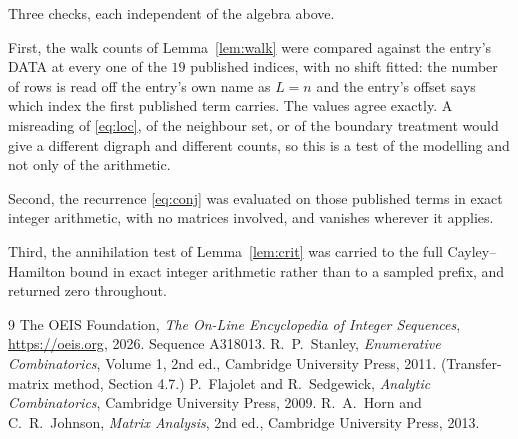 \documentclass[11pt,a4paper]{article}
\theoremstyle{plain}
\theoremstyle{definition}
\begin{document}
Three checks, each independent of the algebra above.

First, the walk counts of Lemma~\ref{lem:walk} were compared against the entry's DATA at
every one of the $19$ published indices, with no shift fitted: the number of rows is
read off the entry's own name as $L=n$ and the entry's offset says which index the first
published term carries. The values agree exactly. A misreading of \eqref{eq:loc}, of the
neighbour set, or of the boundary treatment would give a different digraph and different
counts, so this is a test of the modelling and not only of the arithmetic.

Second, the recurrence \eqref{eq:conj} was evaluated on those published terms in exact
integer arithmetic, with no matrices involved, and vanishes wherever it applies.

Third, the annihilation test of Lemma~\ref{lem:crit} was carried to the full
Cayley--Hamilton bound in exact integer arithmetic rather than to a sampled prefix, and
returned zero throughout.

\begin{thebibliography}{9}
 The OEIS Foundation, \emph{The On-Line Encyclopedia of Integer
Sequences}, \url{https://oeis.org}, 2026. Sequence A318013.
 R.~P.~Stanley, \emph{Enumerative Combinatorics}, Volume 1, 2nd ed.,
Cambridge University Press, 2011. (Transfer-matrix method, Section 4.7.)
 P.~Flajolet and R.~Sedgewick, \emph{Analytic Combinatorics}, Cambridge
University Press, 2009.
 R.~A.~Horn and C.~R.~Johnson, \emph{Matrix Analysis}, 2nd ed., Cambridge
University Press, 2013.
\end{thebibliography}
\end{document}
